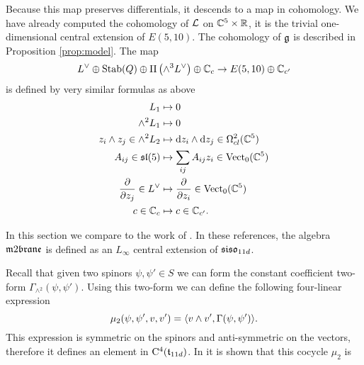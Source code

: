Because this map preserves differentials, it descends to a map in cohomology. 
We have already computed the cohomology of $\mathcal L$ on $\mathbb C^5 \times \mathbb R$, it is the trivial one-dimensional central extension of $E (5,10)$. 
The cohomology of $\mathfrak g$ is described in Proposition \ref{prop:model}. 
The map
\[
L^\vee \oplus {\rm Stab}(Q) \oplus \Pi \left(\wedge^3 L^\vee\right) \oplus \mathbb C_c \to E (5,10) \oplus \mathbb C_{c'}
\]
is defined by very similar formulas as above
\begin{align*}
 L_1 & \mapsto 0 \\
 \wedge^2 L_1 & \mapsto 0 \\
z_i \wedge z_j \in \wedge^2 L_2 & \mapsto {\rm d} z_i \wedge {\rm d} z_j \in \Omega^{2}_{cl} (\mathbb C^5) \\
A_{ij} \in \mathfrak{sl}(5) & \mapsto \sum_{ij} A_{ij} z_i \in {\rm Vect}_0(\mathbb C^5) \\ \frac{\partial}{\partial z_j} \in L^\vee & \mapsto
\frac{\partial}{\partial z_i} \in {\rm Vect}_0(\mathbb C^5) \\
c \in \mathbb C_c & \mapsto c \in \mathbb C_{c'} .
\end{align*}

\parsec[]

In this section we compare to the work of .
In these references, the algebra $\m2$ is defined as an $L_\infty$  
central extension of $\mathfrak{siso}_{11d}$. 

Recall that given two spinors $\psi, \psi' \in S$ we can form the constant coefficient two-form $\Gamma_{\wedge^2} (\psi, \psi')$. 
Using this two-form we can define the following four-linear expression
\[
\mu_2 (\psi, \psi',v,v') = \langle v \wedge v', \Gamma(\psi, \psi')\rangle .
\]
This expression is symmetric on the spinors and anti-symmetric on the vectors, therefore it defines an element in ${\rm C}^4(\mathfrak t_{11d})$. 
In \cite{??} it is shown that this cocycle $\mu_2$ is 

